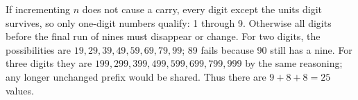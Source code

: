 If incrementing $n$ does not cause a carry, every digit except the units digit survives, so only one-digit numbers qualify: 1 through 9. Otherwise all digits before the final run of nines must disappear or change. For two digits, the possibilities are $19,29,39,49,59,69,79,99$; 89 fails because 90 still has a nine. For three digits they are $199,299,399,499,599,699,799,999$ by the same reasoning; any longer unchanged prefix would be shared. Thus there are $9+8+8=\boxed{25}$ values.
